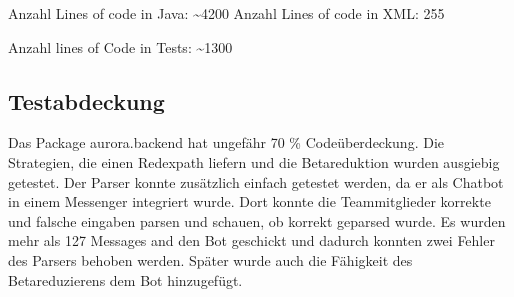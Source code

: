 \documentclass[parskip=full,11pt,twoside]{scrartcl}
\begin{document}
Anzahl Lines of code in Java: \textasciitilde 4200
Anzahl Lines of code in XML: 255

Anzahl lines of Code in Tests: \textasciitilde 1300


\subsection{Testabdeckung}
Das Package aurora.backend hat ungefähr 70 \% Codeüberdeckung.
Die Strategien, die einen Redexpath liefern und die Betareduktion wurden ausgiebig getestet.
Der Parser konnte zusätzlich einfach getestet werden, da er als Chatbot in einem Messenger integriert wurde.
Dort konnte die Teammitglieder korrekte und falsche eingaben parsen und schauen,
ob korrekt geparsed wurde.
Es wurden mehr als 127 Messages and den Bot geschickt und dadurch konnten zwei
Fehler des Parsers behoben werden.
Später wurde auch die Fähigkeit des Betareduzierens dem Bot hinzugefügt.
\newpage
\end{document}
